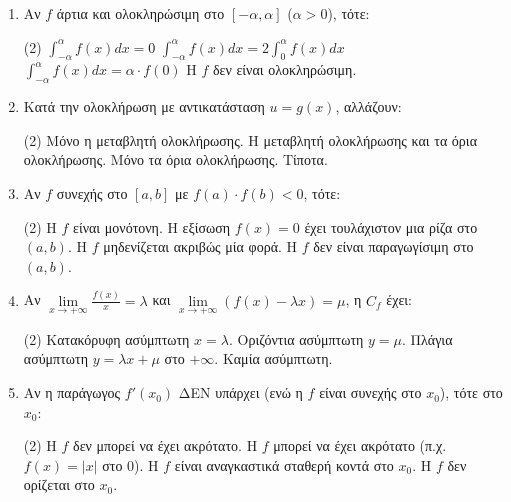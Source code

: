 \documentclass[11pt,a4paper]{article}
\renewcommand{\textdexiakeraia}{}
\newcommand{\dint}{\displaystyle\int}
\begin{document}
\begin{enumerate}[label=\textbf{\arabic*.}, itemsep=4mm]
    \item Αν $f$ άρτια και ολοκληρώσιμη στο $[-\alpha, \alpha]$ ($\alpha > 0$), τότε:
    \begin{tasks}[label=\let\textdexiakeraia\relax\alph*.](2)
        \task $\dint_{-\alpha}^{\alpha} f(x) dx = 0$
        \task $\dint_{-\alpha}^{\alpha} f(x) dx = 2\dint_0^{\alpha} f(x) dx$
        \task $\dint_{-\alpha}^{\alpha} f(x) dx = \alpha \cdot f(0)$
        \task H $f$ δεν είναι ολοκληρώσιμη.
    \end{tasks}

    \item Κατά την ολοκλήρωση με αντικατάσταση $u = g(x)$, αλλάζουν:
    \begin{tasks}[label=\let\textdexiakeraia\relax\alph*.](2)
        \task Μόνο η μεταβλητή ολοκλήρωσης.
        \task H μεταβλητή ολοκλήρωσης και τα όρια ολοκλήρωσης.
        \task Μόνο τα όρια ολοκλήρωσης.
        \task Τίποτα.
    \end{tasks}

    \item Αν $f$ συνεχής στο $[a,b]$ με $f(a) \cdot f(b) < 0$, τότε:
    \begin{tasks}[label=\let\textdexiakeraia\relax\alph*.](2)
        \task Η $f$ είναι μονότονη.
        \task Η εξίσωση $f(x) = 0$ έχει τουλάχιστον μια ρίζα στο $(a,b)$.
        \task Η $f$ μηδενίζεται ακριβώς μία φορά.
        \task Η $f$ δεν είναι παραγωγίσιμη στο $(a,b)$.
    \end{tasks}

    \item Αν $\lim\limits_{x\to +\infty} \frac{f(x)}{x} = \lambda$ και $\lim\limits_{x\to +\infty} (f(x) - \lambda x) = \mu$, η $C_f$ έχει:
    \begin{tasks}[label=\let\textdexiakeraia\relax\alph*.](2)
        \task Κατακόρυφη ασύμπτωτη $x = \lambda$.
        \task Οριζόντια ασύμπτωτη $y = \mu$.
        \task Πλάγια ασύμπτωτη $y = \lambda x + \mu$ στο $+\infty$.
        \task Καμία ασύμπτωτη.
    \end{tasks}

    \item Αν η παράγωγος $f'(x_0)$ ΔΕΝ υπάρχει (ενώ η $f$ είναι συνεχής στο $x_0$), τότε στο $x_0$:
    \begin{tasks}[label=\let\textdexiakeraia\relax\alph*.](2)
        \task Η $f$ δεν μπορεί να έχει ακρότατο.
        \task Η $f$ μπορεί να έχει ακρότατο (π.χ. $f(x)=|x|$ στο $0$).
        \task Η $f$ είναι αναγκαστικά σταθερή κοντά στο $x_0$.
        \task Η $f$ δεν ορίζεται στο $x_0$.
    \end{tasks}


\end{enumerate}
\end{document}
